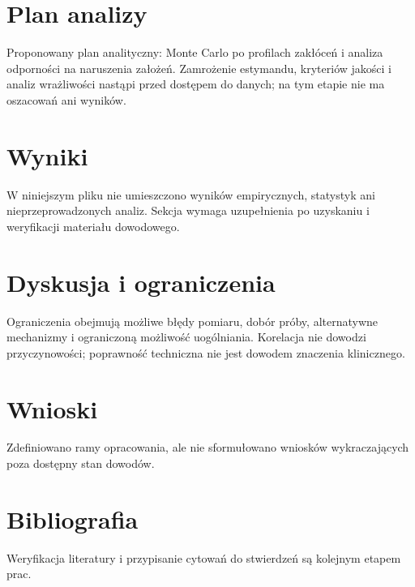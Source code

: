 \documentclass[11pt,a4paper]{article}
\begin{document}
\section{Plan analizy}

Proponowany plan analityczny: Monte Carlo po profilach zakłóceń i analiza odporności na naruszenia założeń. Zamrożenie estymandu, kryteriów jakości i analiz wrażliwości nastąpi przed dostępem do danych; na tym etapie nie ma oszacowań ani wyników.

\section{Wyniki}

W niniejszym pliku nie umieszczono wyników empirycznych, statystyk ani nieprzeprowadzonych analiz. Sekcja wymaga uzupełnienia po uzyskaniu i weryfikacji materiału dowodowego.

\section{Dyskusja i ograniczenia}

Ograniczenia obejmują możliwe błędy pomiaru, dobór próby, alternatywne mechanizmy i ograniczoną możliwość uogólniania. Korelacja nie dowodzi przyczynowości; poprawność techniczna nie jest dowodem znaczenia klinicznego.

\section{Wnioski}

Zdefiniowano ramy opracowania, ale nie sformułowano wniosków wykraczających poza dostępny stan dowodów.

\section*{Bibliografia}

Weryfikacja literatury i przypisanie cytowań do stwierdzeń są kolejnym etapem prac.
\end{document}
